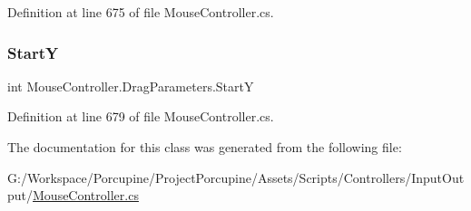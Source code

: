 Definition at line 675 of file Mouse\+Controller.\+cs.

\mbox{\label{class_mouse_controller_1_1_drag_parameters_a175944afab130905b4357e06132a7026}} 
\subsubsection{\texorpdfstring{StartY}{StartY}}
{\footnotesize\ttfamily int Mouse\+Controller.\+Drag\+Parameters.\+StartY\hspace{0.3cm}{\ttfamily [get]}}



Definition at line 679 of file Mouse\+Controller.\+cs.



The documentation for this class was generated from the following file\+:\begin{DoxyCompactItemize}
\item 
G\+:/\+Workspace/\+Porcupine/\+Project\+Porcupine/\+Assets/\+Scripts/\+Controllers/\+Input\+Output/\hyperlink{_mouse_controller_8cs}{Mouse\+Controller.\+cs}\end{DoxyCompactItemize}
